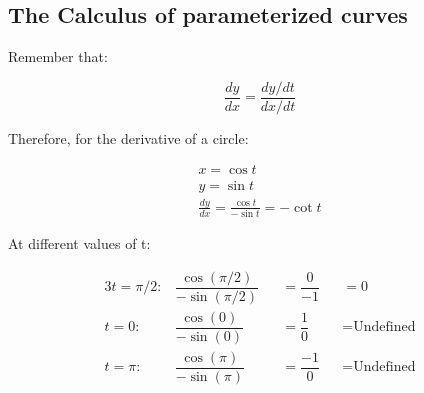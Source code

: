 \documentclass[\pointsize, letterpaper]{article}
\begin{document}
    \pagebreak

    \subsection*{The Calculus of parameterized curves}

    Remember that:

    \begin{equation}
        \frac{dy}{dx} = \frac{dy/dt}{dx/dt}
    \end{equation}

    Therefore, for the derivative of a circle:

    \begin{equation}
        \begin{gathered}
            x = \cos t  \\
            y = \sin t  \\
            \frac{dy}{dx} = 
            \frac{\cos t}{-\sin t} = 
            -\cot t
        \end{gathered}
    \end{equation}

    At different values of t:

    \begin{alignat*}{3}
        t = \pi/2:  & \dfrac{\cos(\pi/2)}{-\sin(\pi/2)} 
                    && = \dfrac{0}{-1} 
                    && = 0                   \\
        t = 0:      & \dfrac{\cos(0)}{-\sin(0)} 
                    && = \dfrac{1}{0} 
                    && = \text{Undefined}    \\
        t = \pi:    & \dfrac{\cos(\pi)}{-\sin(\pi)} 
                    && = \dfrac{-1}{0} 
                    && = \text{Undefined}    \\
    \end{alignat*}

    
\end{document}
